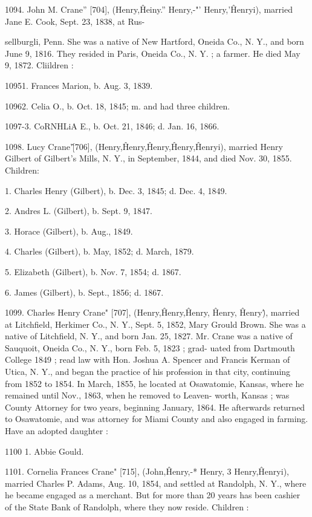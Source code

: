 \documentclass{book}
\begin{document}
1094. John M. Crane'' [704], (Henry,\^ Heiny.'' Henry,-"' 
Henry,'\^ Henryi), married Jane E. Cook, Sept. 23, 1838, at Rus- 




sellburgli, Penn. She was a native of New Hartford, Oneida 
Co., N. Y., and born June 9, 1816. They resided in Paris, 
Oneida Co., N. Y. ; a farmer. He died May 9, 1872. Cliildren : 

10951. Frances Marion, b. Aug. 3, 1839. 

10962. Celia O., b. Oct. 18, 1845; m. and had three children. 

1097-3. CoRNHLiA E., b. Oct. 21, 1846; d. Jan. 16, 1866. 

1098. Lucy Crane'\^ [706], (Henry,\^ Henry,\^ Henry,\^ Henry,\^ 
Henryi), married Henry Gilbert of Gilbert's Mills, N. Y., in 
September, 1844, and died Nov. 30, 1855. Children: 

1. Charles Henry (Gilbert), b. Dec. 3, 1845; d. Dec. 4, 1849. 

2. Andres L. (Gilbert), b. Sept. 9, 1847. 

3. Horace (Gilbert), b. Aug., 1849. 

4. Charles (Gilbert), b. May, 1852; d. March, 1879. 

5. Elizabeth (Gilbert), b. Nov. 7, 1854; d. 1867. 

6. James (Gilbert), b. Sept., 1856; d. 1867. 

1099. Charles Henry Crane" [707], (Henry,\^ Henry,\^ 
Henry, \^ Henry, \^ Henry\^), married at Litchfield, Herkimer Co., 
N. Y., Sept. 5, 1852, Mary Grould Brown. She was a native of 
Litchfield, N. Y., and born Jan. 25, 1827. Mr. Crane was a 
native of Sauquoit, Oneida Co., N. Y., born Feb. 5, 1823 ; grad- 
uated from Dartmouth College 1849 ; read law with Hon. Joshua 
A. Spencer and Francis Kerman of Utica, N. Y., and began the 
practice of his profession in that city, continuing from 1852 to 
1854. In March, 1855, he located at Osawatomie, Kansas, 
where he remained until Nov., 1863, when he removed to Leaven- 
worth, Kansas ; was County Attorney for two years, beginning 
January, 1864. He afterwards returned to Osawatomie, and was 
attorney for Miami County and also engaged in farming. Have 
an adopted daughter : 

1100  1. Abbie Gould. 

1101. Cornelia Frances Crane" [715], (John,\^ Henry,-* 
Henry, 3 Henry,\^ Henryi), married Charles P. Adams, Aug. 10, 
1854, and settled at Randolph, N. Y., where he became engaged 
as a merchant. But for more than 20 years has been cashier of 
the State Bank of Randolph, where they now reside. Children : 
\end{document}
